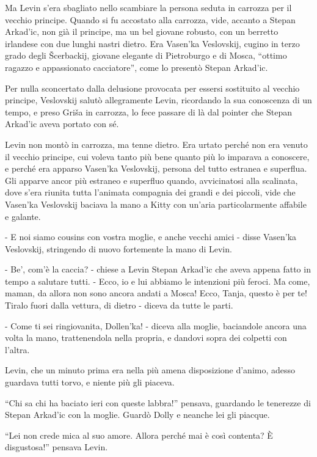 Ma Levin s'era sbagliato nello scambiare la persona seduta in carrozza per il vecchio principe. Quando si fu accostato alla carrozza, vide, accanto a Stepan Arkad'ic, non già il principe, ma un bel giovane robusto, con un berretto irlandese con due lunghi nastri dietro. Era Vasen'ka Veslovskij, cugino in terzo grado degli Šcerbackij, giovane elegante di Pietroburgo e di Mosca, ``ottimo ragazzo e appassionato cacciatore'', come lo presentò Stepan Arkad'ic. 

Per nulla sconcertato dalla delusione provocata per essersi sostituito al vecchio principe, Veslovskij salutò allegramente Levin, ricordando la sua conoscenza di un tempo, e preso Griša in carrozza, lo fece passare di là dal pointer che Stepan Arkad'ic aveva portato con sé. 

Levin non montò in carrozza, ma tenne dietro. Era urtato perché non era venuto il vecchio principe, cui voleva tanto più bene quanto più lo imparava a conoscere, e perché era apparso Vasen'ka Veslovskij, persona del tutto estranea e superflua. Gli apparve ancor più estraneo e superfluo quando, avvicinatosi alla scalinata, dove s'era riunita tutta l'animata compagnia dei grandi e dei piccoli, vide che Vasen'ka Veslovskij baciava la mano a Kitty con un'aria particolarmente affabile e galante. 

- E noi siamo cousins con vostra moglie, e anche vecchi amici - disse Vasen'ka Veslovskij, stringendo di nuovo fortemente la mano di Levin. 

- Be', com'è la caccia? - chiese a Levin Stepan Arkad'ic che aveva appena fatto in tempo a salutare tutti. - Ecco, io e lui abbiamo le intenzioni più feroci. Ma come, maman, da allora non sono ancora andati a Mosca! Ecco, Tanja, questo è per te! Tiralo fuori dalla vettura, di dietro - diceva da tutte le parti. 

- Come ti sei ringiovanita, Dollen'ka! - diceva alla moglie, baciandole ancora una volta la mano, trattenendola nella propria, e dandovi sopra dei colpetti con l'altra. 

Levin, che un minuto prima era nella più amena disposizione d'animo, adesso guardava tutti torvo, e niente più gli piaceva. 

``Chi sa chi ha baciato ieri con queste labbra!'' pensava, guardando le tenerezze di Stepan Arkad'ic con la moglie. Guardò Dolly e neanche lei gli piacque. 

``Lei non crede mica al suo amore. Allora perché mai è così contenta? È disgustosa!'' pensava Levin. 

